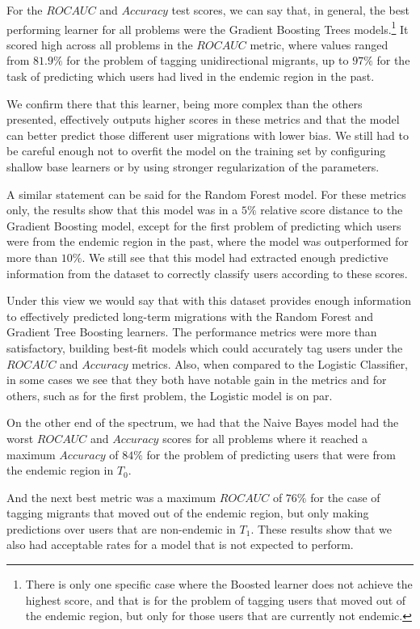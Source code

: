 For the $ROC AUC$ and $Accuracy$ test scores, we can say that, in general, the best performing learner for all problems were the Gradient Boosting Trees models.\footnote{There is only one specific case where the Boosted learner does not achieve the highest score, and that is for the problem of tagging users that moved out of the endemic region, but only for those users that are currently not endemic.}
It scored high across all problems in the $ROC AUC$ metric, where values ranged from $81.9\%$ for the problem of tagging unidirectional migrants, up to $97\%$ for the task of predicting which users had lived in the endemic region in the past.

We confirm there that this learner, being more complex than the others presented, effectively outputs higher scores in these metrics and
that the model can better predict those different user migrations with lower bias.
We still had to be careful enough not to overfit the model on the training set by configuring shallow base learners or by using stronger regularization of the parameters.

A similar statement can be said for the Random Forest model.
For these metrics only, the results show that this model was in a $5\%$ relative score distance to the Gradient Boosting model, except for the first problem of predicting which users were from the endemic region in the past, where the model was outperformed for more than $10\%$.
We still see that this model had extracted enough predictive information from the dataset to correctly classify users according to these scores.

Under this view we would say that with this dataset provides enough information to effectively predicted long-term migrations with the Random Forest and Gradient Tree Boosting learners.
The performance metrics were more than satisfactory, building best-fit models which could accurately tag users under the $ROC AUC$ and $Accuracy$ metrics.
Also, when compared to the Logistic Classifier, in some cases we see that they both have notable gain in the metrics and for others, such as for the first problem, the Logistic model is on par.

On the other end of the spectrum, we had that the Naive Bayes model had the worst $ROC AUC$ and $Accuracy$ scores for all problems where it reached a maximum $Accuracy$ of $84\%$ for the problem of predicting users that were from the endemic region in $T_0$.

And the next best metric was a maximum $ROC AUC$ of $76\%$ for the case of tagging migrants that moved out of the endemic region, but only making predictions over users that are non-endemic in $T_1$.
These results show that we also had acceptable rates for a model that is not expected to perform.

